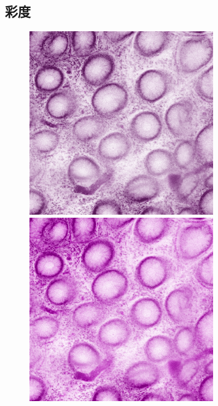 \subsection*{彩度}
\begin{figure}[H]
	\centering
	
	\begin{minipage}{0.25\columnwidth}
		\centering
		\includegraphics[clip, width=\linewidth]{fig/preprocessing/data_aug/color/SATURATION/SATURATION_0_50}
	\end{minipage}
	\begin{minipage}{0.25\columnwidth}
		\centering
		\includegraphics[clip, width=\linewidth]{fig/preprocessing/data_aug/color/SATURATION/SATURATION_1_00}

\end{minipage}
\end{figure}
